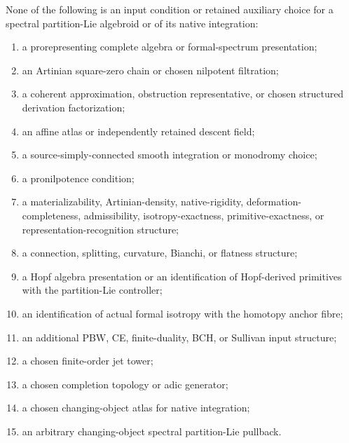 None of the following is an input condition or retained auxiliary choice for a spectral partition-Lie algebroid or
of its native integration:
\begin{enumerate}
    \item a prorepresenting complete algebra or formal-spectrum presentation;
    \item an Artinian square-zero chain or chosen nilpotent filtration;
    \item a coherent approximation, obstruction representative, or chosen structured
    derivation factorization;
    \item an affine atlas or independently retained descent field;
    \item a source-simply-connected smooth integration or monodromy choice;
    \item a pronilpotence condition;
    \item a materializability, Artinian-density, native-rigidity,
    deformation-completeness, admissibility, isotropy-exactness,
    primitive-exactness, or representation-recognition structure;
    \item a connection, splitting, curvature, Bianchi, or flatness structure;
    \item a Hopf algebra presentation or an identification of Hopf-derived
    primitives with the partition-Lie controller;
    \item an identification of actual formal isotropy with the homotopy anchor
    fibre;
    \item an additional PBW, CE, finite-duality, BCH, or Sullivan input structure;
    \item a chosen finite-order jet tower;
    \item a chosen completion topology or adic generator;
    \item a chosen changing-object atlas for native integration;
    \item an arbitrary changing-object spectral partition-Lie pullback.
\end{enumerate}

